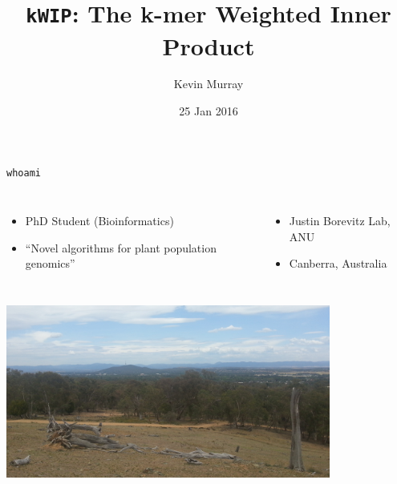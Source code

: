 \documentclass[t]{beamer}
\title{\texttt{kWIP}: The k-mer Weighted Inner Product}
\author{Kevin Murray}
\institute{Borevitz Lab, CPEB, ANU}
\date{25 Jan 2016}
\begin{document}
{
\begin{frame}
  \titlepage
  \vfill
\end{frame}
}

\begin{frame}{\texttt{whoami}}
  \begin{columns}[t]
      \begin{itemize}
        \item PhD Student (Bioinformatics)
        \item ``Novel algorithms for plant population genomics''
      \end{itemize}
      \begin{itemize}
        \item Justin Borevitz Lab, ANU
        \item Canberra, Australia
      \end{itemize}
  \end{columns}
  \begin{center}
    \includegraphics[width=0.8\textwidth]{img/canberra.png}
  \end{center}
\end{frame}
\end{document}
